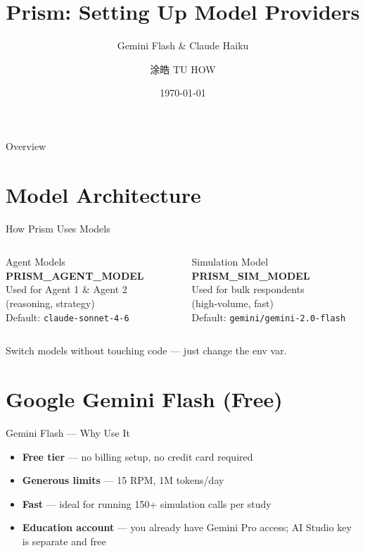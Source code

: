 \documentclass{beamer}
\title[Prism: Model Setup]{Prism: Setting Up Model Providers}
\subtitle{Gemini Flash \& Claude Haiku}
\author{涂皓 TU HOW}
\date{\today}
\begin{document}
\begin{frame}
  \titlepage
\end{frame}

\begin{frame}{Overview}
  \tableofcontents
\end{frame}

\section{Model Architecture}

\begin{frame}{How Prism Uses Models}
  \begin{columns}
      \begin{block}{Agent Models}
        \textbf{PRISM\_AGENT\_MODEL}\\[6pt]
        Used for Agent 1 \& Agent 2\\
        (reasoning, strategy)\\[6pt]
        Default: \texttt{claude-sonnet-4-6}
      \end{block}
      \begin{block}{Simulation Model}
        \textbf{PRISM\_SIM\_MODEL}\\[6pt]
        Used for bulk respondents\\
        (high-volume, fast)\\[6pt]
        Default: \texttt{gemini/gemini-2.0-flash}
      \end{block}
  \end{columns}
  \vspace{10pt}
  \centering
  \alert{Switch models without touching code — just change the env var.}
\end{frame}

\section{Google Gemini Flash (Free)}

\begin{frame}{Gemini Flash — Why Use It}
  \begin{itemize}
    \item \textbf{Free tier} — no billing setup, no credit card required
    \pause
    \item \textbf{Generous limits} — 15 RPM, 1M tokens/day
    \pause
    \item \textbf{Fast} — ideal for running 150+ simulation calls per study
    \pause
    \item \textbf{Education account} — you already have Gemini Pro access; AI Studio key is separate and free
  \end{itemize}
\end{frame}
\end{document}
